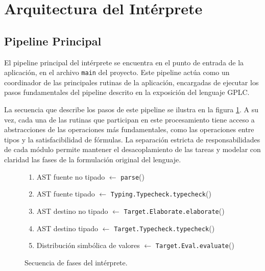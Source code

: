 
\newpage
\section{Arquitectura del Intérprete}
\label{sec:arquitectura}


\subsection{Pipeline Principal}
El pipeline principal del intérprete se encuentra en el punto de
entrada de la aplicación, en el archivo \verb|main| del proyecto. Este pipeline actúa como un coordinador de las principales rutinas de la
aplicación, encargadas de ejecutar los pasos fundamentales del
pipeline descrito en la exposición del lenguaje GPLC.

La secuencia que describe los pasos de este pipeline se ilustra en la
figura  \ref{fig:pipeline}. A su vez, cada una de las rutinas que participan en este
procesamiento tiene acceso a abstracciones de las operaciones más
fundamentales, como las operaciones entre tipos y la satisfacibilidad de
fórmulas. La separación estricta de responsabilidades de cada módulo
permite mantener el desacoplamiento de las tareas y modelar con
claridad las fases de la formulación original del lenguaje.


\begin{figure}[h]

\begin{tcolorbox}[title={Pipeline}, colback=white, colframe=black]
\begin{enumerate}
  \item AST fuente no tipado \(\leftarrow\) \texttt{parse}()
  \item AST fuente tipado \(\leftarrow\) \texttt{Typing.Typecheck.typecheck}()
  \item AST destino no tipado \(\leftarrow\) \texttt{Target.Elaborate.elaborate}()
  \item AST destino tipado \(\leftarrow\) \texttt{Target.Typecheck.typecheck}()
  \item Distribución simbólica de valores \(\leftarrow\) \texttt{Target.Eval.evaluate}()
\end{enumerate}
\end{tcolorbox}

\caption{Secuencia de fases del intérprete.}
\label{fig:pipeline}
\end{figure}

